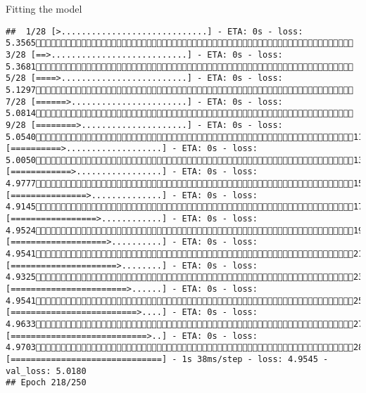 \documentclass[
  ignorenonframetext,
]{beamer}
\begin{document}
\begin{frame}[fragile]{Fitting the model}
\begin{verbatim}
##  1/28 [>.............................] - ETA: 0s - loss: 5.3565 3/28 [==>...........................] - ETA: 0s - loss: 5.3681 5/28 [====>.........................] - ETA: 0s - loss: 5.1297 7/28 [======>.......................] - ETA: 0s - loss: 5.0814 9/28 [========>.....................] - ETA: 0s - loss: 5.054011/28 [==========>...................] - ETA: 0s - loss: 5.005013/28 [============>.................] - ETA: 0s - loss: 4.977715/28 [===============>..............] - ETA: 0s - loss: 4.914517/28 [=================>............] - ETA: 0s - loss: 4.952419/28 [===================>..........] - ETA: 0s - loss: 4.954121/28 [=====================>........] - ETA: 0s - loss: 4.932523/28 [=======================>......] - ETA: 0s - loss: 4.954125/28 [=========================>....] - ETA: 0s - loss: 4.963327/28 [===========================>..] - ETA: 0s - loss: 4.970328/28 [==============================] - 1s 38ms/step - loss: 4.9545 - val_loss: 5.0180
## Epoch 218/250

\end{verbatim}
\end{frame}
\end{document}
